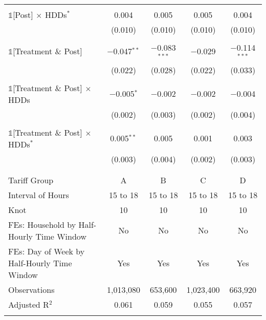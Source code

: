 \begin{table}[!htbp]
\begin{tabular}{@{\extracolsep{30pt}}lcccc}
  & & & & \\ 
 $\mathbb{1}$[Post] $\times$ HDDs$^{*}$ & 0.004 & 0.005 & 0.005 & 0.004 \\ 
  & (0.010) & (0.010) & (0.010) & (0.010) \\ 
  & & & & \\ 
 $\mathbb{1}$[Treatment \& Post] & $-$0.047$^{**}$ & $-$0.083$^{***}$ & $-$0.029 & $-$0.114$^{***}$ \\ 
  & (0.022) & (0.028) & (0.022) & (0.033) \\ 
  & & & & \\ 
 $\mathbb{1}$[Treatment \& Post] $\times$ HDDs & $-$0.005$^{*}$ & $-$0.002 & $-$0.002 & $-$0.004 \\ 
  & (0.002) & (0.003) & (0.002) & (0.004) \\ 
  & & & & \\ 
 $\mathbb{1}$[Treatment \& Post] $\times$ HDDs$^{*}$ & 0.005$^{**}$ & 0.005 & 0.001 & 0.003 \\ 
  & (0.003) & (0.004) & (0.002) & (0.003) \\ 
  & & & & \\ 
\hline \\[-1.8ex] 
Tariff Group & A & B & C & D \\ 
Interval of Hours & 15 to 18 & 15 to 18 & 15 to 18 & 15 to 18 \\ 
Knot & 10 & 10 & 10 & 10 \\ 
FEs: Household by Half-Hourly Time Window & No & No & No & No \\ 
FEs: Day of Week by Half-Hourly Time Window & Yes & Yes & Yes & Yes \\ 
Observations & 1,013,080 & 653,600 & 1,023,400 & 663,920 \\ 
Adjusted R$^{2}$ & 0.061 & 0.059 & 0.055 & 0.057 \\ 
\hline 
\hline \\[-1.8ex] 
\end{tabular} 
\end{table} 
